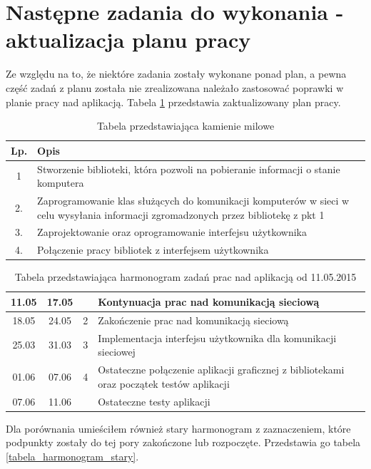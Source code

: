 \documentclass[a4paper]{article}
\begin{document}
\section{Następne zadania do wykonania - aktualizacja planu pracy}
Ze względu na to, że niektóre zadania zostały wykonane ponad plan, a pewna część zadań z planu została nie zrealizowana należało zastosować poprawki w planie pracy nad aplikacją. Tabela \ref{tabela_harmonogram} przedstawia zaktualizowany plan pracy.
\begin{table}[h]
			\centering
			\begin{tabularx}{0.65\textwidth}{|c|X|}
				\hline
				Lp. & Opis \\ \hline
				1 & Stworzenie biblioteki, która pozwoli na pobieranie informacji o stanie komputera \\ \hline
				2. & Zaprogramowanie klas służących do komunikacji komputerów w sieci w celu wysyłania informacji zgromadzonych przez bibliotekę z pkt 1 \\ \hline
				3. & Zaprojektowanie oraz oprogramowanie interfejsu użytkownika \\ \hline
				4. & Połączenie pracy bibliotek z interfejsem użytkownika \\ \hline
			\end{tabularx}
			\caption{Tabela przedstawiająca kamienie milowe}
		\end{table}
\begin{table}[h]
			\centering
			\begin{tabularx}{\linewidth}{|c|c|c|X|}
				\hline
				11.05 & 17.05 &   & Kontynuacja prac nad komunikacją sieciową  \\ \hline
				18.05 & 24.05 & 2 & Zakończenie prac nad komunikacją sieciową \\ \hline
				25.03 & 31.03 & 3 & Implementacja interfejsu użytkownika dla komunikacji sieciowej \\ \hline
				01.06 & 07.06 & 4 & Ostateczne połączenie aplikacji graficznej z bibliotekami oraz początek testów aplikacji \\ \hline
				07.06 & 11.06 &  & Ostateczne testy aplikacji \\ \hline
			\end{tabularx}
			\caption{Tabela przedstawiająca harmonogram zadań prac nad aplikacją od 11.05.2015}
			\label{tabela_harmonogram}
		\end{table}
Dla porównania umieściłem również stary harmonogram z zaznaczeniem, które podpunkty zostały do tej pory zakończone lub rozpoczęte. Przedstawia go tabela \ref{tabela_harmonogram_stary}.
\end{document}
